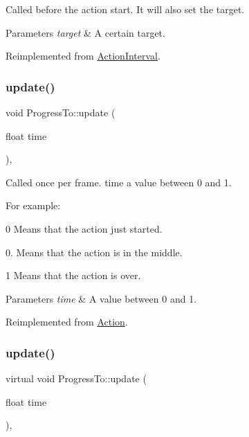 Called before the action start. It will also set the target.


\begin{DoxyParams}{Parameters}
{\em target} & A certain target. \\
\hline
\end{DoxyParams}


Reimplemented from \hyperlink{classActionInterval_ad3d91186b2c3108488ddbbdbbd982484}{Action\+Interval}.

\mbox{\label{classProgressTo_afce4ccb876eb502a7c1fa7521cb06099}} 
\subsubsection{\texorpdfstring{update()}{update()}\hspace{0.1cm}{\footnotesize\ttfamily [1/2]}}
{\footnotesize\ttfamily void Progress\+To\+::update (\begin{DoxyParamCaption}\item[{float}]{time }\end{DoxyParamCaption})\hspace{0.3cm}{\ttfamily [override]}, {\ttfamily [virtual]}}

Called once per frame. time a value between 0 and 1.

For example\+:
\begin{DoxyItemize}
\item 0 Means that the action just started.
\item 0. Means that the action is in the middle.
\item 1 Means that the action is over.
\end{DoxyItemize}


\begin{DoxyParams}{Parameters}
{\em time} & A value between 0 and 1. \\
\hline
\end{DoxyParams}


Reimplemented from \hyperlink{classAction_a937e646e63915e33ad05ba149bfcf239}{Action}.

\mbox{\label{classProgressTo_a33f0be899372bd32644de3d87a0308f3}} 
\subsubsection{\texorpdfstring{update()}{update()}\hspace{0.1cm}{\footnotesize\ttfamily [2/2]}}
{\footnotesize\ttfamily virtual void Progress\+To\+::update (\begin{DoxyParamCaption}\item[{float}]{time }\end{DoxyParamCaption})\hspace{0.3cm}{\ttfamily [override]}, {\ttfamily [virtual]}}

